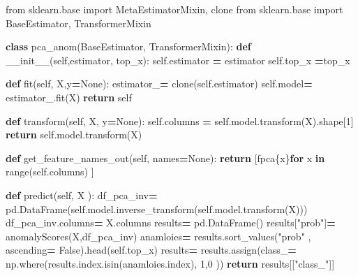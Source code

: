 \documentclass[
]{article}
\newenvironment{Shaded}{\begin{snugshade}}{\end{snugshade}}
\newcommand{\BuiltInTok}[1]{#1}
\newcommand{\ControlFlowTok}[1]{\textcolor[rgb]{0.13,0.29,0.53}{\textbf{#1}}}
\newcommand{\DecValTok}[1]{\textcolor[rgb]{0.00,0.00,0.81}{#1}}
\newcommand{\FunctionTok}[1]{\textcolor[rgb]{0.00,0.00,0.00}{#1}}
\newcommand{\ImportTok}[1]{#1}
\newcommand{\KeywordTok}[1]{\textcolor[rgb]{0.13,0.29,0.53}{\textbf{#1}}}
\newcommand{\NormalTok}[1]{#1}
\newcommand{\OperatorTok}[1]{\textcolor[rgb]{0.81,0.36,0.00}{\textbf{#1}}}
\newcommand{\SpecialCharTok}[1]{\textcolor[rgb]{0.00,0.00,0.00}{#1}}
\newcommand{\SpecialStringTok}[1]{\textcolor[rgb]{0.31,0.60,0.02}{#1}}
\newcommand{\StringTok}[1]{\textcolor[rgb]{0.31,0.60,0.02}{#1}}
\newcommand{\VariableTok}[1]{\textcolor[rgb]{0.00,0.00,0.00}{#1}}
\begin{document}
\begin{Shaded}
\begin{Highlighting}[]
\ImportTok{from}\NormalTok{ sklearn.base }\ImportTok{import}\NormalTok{ MetaEstimatorMixin, clone}
\ImportTok{from}\NormalTok{ sklearn.base }\ImportTok{import}\NormalTok{ BaseEstimator, TransformerMixin}

\KeywordTok{class}\NormalTok{ pca\_anom(BaseEstimator, TransformerMixin):}
    \KeywordTok{def} \FunctionTok{\_\_init\_\_}\NormalTok{(}\VariableTok{self}\NormalTok{,estimator, top\_x):           }
        \VariableTok{self}\NormalTok{.estimator }\OperatorTok{=}\NormalTok{ estimator}
        \VariableTok{self}\NormalTok{.top\_x }\OperatorTok{=}\NormalTok{top\_x}
    
    \KeywordTok{def}\NormalTok{ fit(}\VariableTok{self}\NormalTok{, X,y}\OperatorTok{=}\VariableTok{None}\NormalTok{):       }
\NormalTok{       estimator\_}\OperatorTok{=}\NormalTok{ clone(}\VariableTok{self}\NormalTok{.estimator)}
       \VariableTok{self}\NormalTok{.model}\OperatorTok{=}\NormalTok{ estimator\_.fit(X)}
       \ControlFlowTok{return} \VariableTok{self}   
        
    \KeywordTok{def}\NormalTok{ transform(}\VariableTok{self}\NormalTok{, X, y}\OperatorTok{=}\VariableTok{None}\NormalTok{):                }
        \VariableTok{self}\NormalTok{.columns }\OperatorTok{=} \VariableTok{self}\NormalTok{.model.transform(X).shape[}\DecValTok{1}\NormalTok{]        }
        \ControlFlowTok{return} \VariableTok{self}\NormalTok{.model.transform(X)}
    
    \KeywordTok{def}\NormalTok{ get\_feature\_names\_out(}\VariableTok{self}\NormalTok{, names}\OperatorTok{=}\VariableTok{None}\NormalTok{):        }
        \ControlFlowTok{return}\NormalTok{ [}\SpecialStringTok{f\textquotesingle{}pca}\SpecialCharTok{\{}\NormalTok{x}\SpecialCharTok{\}}\SpecialStringTok{\textquotesingle{}}\ControlFlowTok{for}\NormalTok{ x }\KeywordTok{in} \BuiltInTok{range}\NormalTok{(}\VariableTok{self}\NormalTok{.columns) ]    }
    
    \KeywordTok{def}\NormalTok{ predict(}\VariableTok{self}\NormalTok{, X ):                   }
\NormalTok{        df\_pca\_inv}\OperatorTok{=}\NormalTok{ pd.DataFrame(}\VariableTok{self}\NormalTok{.model.inverse\_transform(}\VariableTok{self}\NormalTok{.model.transform(X)))}
\NormalTok{        df\_pca\_inv.columns}\OperatorTok{=}\NormalTok{ X.columns       }
\NormalTok{        results}\OperatorTok{=}\NormalTok{ pd.DataFrame()        }
\NormalTok{        results[}\StringTok{"prob"}\NormalTok{]}\OperatorTok{=}\NormalTok{ anomalyScores(X,df\_pca\_inv)}
\NormalTok{        anamloies}\OperatorTok{=}\NormalTok{ results.sort\_values(}\StringTok{"prob"}\NormalTok{ , ascending}\OperatorTok{=} \VariableTok{False}\NormalTok{).head(}\VariableTok{self}\NormalTok{.top\_x)        }
\NormalTok{        results}\OperatorTok{=}\NormalTok{ results.assign(class\_}\OperatorTok{=}\NormalTok{  np.where(results.index.isin(anamloies.index), }\DecValTok{1}\NormalTok{,}\DecValTok{0}\NormalTok{ ))}
        \ControlFlowTok{return}\NormalTok{ results[[}\StringTok{"class\_"}\NormalTok{]]}
    

\end{Highlighting}
\end{Shaded}
\end{document}
